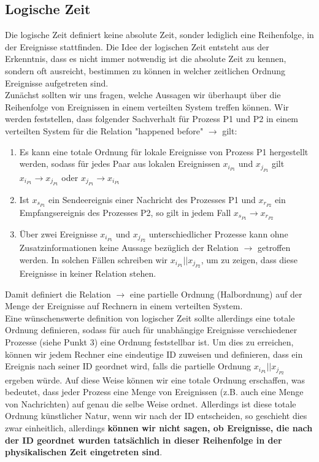 \subsection{Logische Zeit}
\label{sec:logic-time}

Die logische Zeit definiert keine absolute Zeit, sonder lediglich eine Reihenfolge, in der Ereignisse stattfinden. Die Idee der logischen Zeit entsteht aus der Erkenntnis, dass es nicht immer notwendig ist die absolute Zeit zu kennen, sondern oft ausreicht, bestimmen zu können in welcher zeitlichen Ordnung Ereignisse aufgetreten sind.\\
Zunächst sollten wir uns fragen, welche Aussagen wir überhaupt über die Reihenfolge von Ereignissen in einem verteilten System treffen können. Wir werden feststellen, dass folgender Sachverhalt für Prozess P1 und P2 in einem verteilten System für die Relation "happened before" $\rightarrow$ gilt:
\begin{enumerate}
    \item Es kann eine totale Ordnung für lokale Ereignisse von Prozess P1 hergestellt werden, sodass für jedes Paar aus lokalen Ereignissen $x_{i_{P1}}$ und $x_{j_{P1}}$ gilt $x_{i_{P1}} \rightarrow x_{j_{P1}}$ oder $x_{j_{P1}}\rightarrow x_{i_{P1}}$
    \item Ist $x_{s_{P1}}$ ein Sendeereignis einer Nachricht des Prozesses P1 und $x_{r_{P2}}$ ein Empfangsereignis des Prozesses P2, so gilt in jedem Fall $x_{s_{P1}} \rightarrow x_{r_{P2}}$
    \item Über zwei Ereignisse $x_{i_{P1}}$ und $x_{j_{P2}}$ unterschiedlicher Prozesse kann ohne Zusatzinformationen keine Aussage bezüglich der Relation $\rightarrow$ getroffen werden. In solchen Fällen schreiben wir $x_{i_{P1}} || x_{j_{P2}}$, um zu zeigen, dass diese Ereignisse in keiner Relation stehen.
\end{enumerate}

Damit definiert die Relation $\rightarrow$ eine partielle Ordnung (Halbordnung) auf der Menge der Ereignisse auf Rechnern in einem verteilten System.\\

Eine wünschenswerte definition von logischer Zeit sollte allerdings eine totale Ordnung definieren, sodass für auch für unabhängige Ereignisse verschiedener Prozesse (siehe Punkt 3) eine Ordnung feststellbar ist. Um dies zu erreichen, können wir jedem Rechner eine eindeutige ID zuweisen und definieren, dass ein Ereignis nach seiner ID geordnet wird, falls die partielle Ordnung $x_{i_{P1}} || x_{j_{P2}}$ ergeben würde. Auf diese Weise können wir eine totale Ordnung erschaffen, was bedeutet, dass jeder Prozess eine Menge von Ereignissen (z.B. auch eine Menge von Nachrichten) auf genau die selbe Weise ordnet. Allerdings ist diese totale Ordnung künstlicher Natur, wenn wir nach der ID entscheiden, so geschieht dies zwar einheitlich, allerdings \textbf{können wir nicht sagen, ob Ereignisse, die nach der ID geordnet wurden tatsächlich in dieser Reihenfolge in der physikalischen Zeit eingetreten sind}.\\

